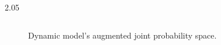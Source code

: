 \documentclass[final,11pt]{beamer}
\newlength{\colwidth}
\renewcommand{\mid}{\,|\,}
\newcommand{\numData}{\ensuremath{t}}
\newcommand{\modeInd}{\ensuremath{k}}
\newcommand{\NumData}{\ensuremath{\MakeUppercase{\numData}}}
\newcommand{\ModeInd}{\ensuremath{\MakeUppercase{\modeInd}}}
\newcommand{\singleData}[1]{\ensuremath{#1_{\numData}}}
\newcommand{\allData}[1]{\ensuremath{\MakeUppercase{#1}}}
\newcommand{\mode}[1]{\ensuremath{#1_{\modeInd}}}
\newcommand{\state}{\ensuremath{\mathbf{x}}}
\newcommand{\control}{\ensuremath{\mathbf{u}}}
\newcommand{\x}{\ensuremath{\mathbf{x}}}
\newcommand{\y}{\ensuremath{y}}
\newcommand{\singleInput}{\ensuremath{\x_{\numData-1}}}
\newcommand{\singleOutput}{\ensuremath{\singleData{\y}}}
\newcommand{\allInput}{\ensuremath{\allData{\x}}}
\newcommand{\allOutput}{\ensuremath{\MakeUppercase{\y}}}
\newcommand{\modeVar}{\ensuremath{\alpha}}
\newcommand{\latentFunc}{\ensuremath{f}}
\newcommand{\timeInd}{\ensuremath{t}}
\newcommand{\TimeInd}{\ensuremath{\MakeUppercase{\timeInd}}}
\renewcommand{\allInput}{\ensuremath{\hat{\state}_{1:\TimeInd}}}
\renewcommand{\allOutput}{\ensuremath{{\Delta\state}_{1:\TimeInd}}}
\renewcommand{\state}{\ensuremath{\mathbf{s}}}
\renewcommand{\mode}[1]{\ensuremath{#1_{\modeInd}}}
\newcommand{\allModeVar}{\ensuremath{\bm{\modeVar}}}
\renewcommand{\numData}{\ensuremath{n}}
\renewcommand{\NumData}{\ensuremath{N}}
\renewcommand{\singleOutput}{\ensuremath{y_{\numData}}}
\renewcommand{\singleInput}{\ensuremath{\mathbf{x}_{\numData}}}
\renewcommand{\allInput}{\ensuremath{\mathbf{X}}}
\renewcommand{\allOutput}{\ensuremath{\mathbf{y}}}
\renewcommand{\allOutput}{\ensuremath{\mathbf{y}}}
\newcommand{\allInputK}{\ensuremath{\mode{\allInput}}}
\newcommand{\expertInducingInput}{\ensuremath{\mode{\bm{\zeta}}}}
\renewcommand{\control}{\ensuremath{\mathbf{a}}}
\newcommand{\action}{\ensuremath{\control}}
\renewcommand{\numData}{\ensuremath{t}}
\renewcommand{\allInput}{\ensuremath{\hat{\mathbf{S}}}}
\renewcommand{\allInputK}{\ensuremath{\mode{\hat{\mathbf{S}}}}}
\renewcommand{\singleInput}{\ensuremath{\hat{\mathbf{s}}_{\timeInd}}}
\renewcommand{\singleOutput}{\ensuremath{\Delta\mathbf{s}_{\timeInd+1}}}
\renewcommand{\allOutput}{\ensuremath{\Delta\mathbf{S}}}
\newcommand{\allOutputK}{\ensuremath{\Delta\mode{\mathbf{S}}}}
\renewcommand{\action}{\ensuremath{\mathbf{a}}}
\begin{document}
\begin{frame}[t]
\begin{columns}[t]
\begin{column}{2.05\colwidth}
\begin{columns}[t]
\begin{column}{\colwidth}
\begin{figure}
{
        }
    \caption{Dynamic model's augmented joint probability space.}
    \label{fig-graphical-model-sparse}
    \end{figure}



    \begin{itemize}


\end{itemize}
\end{column}
\end{columns}
\end{column}
\end{columns}
\end{frame}
\end{document}
